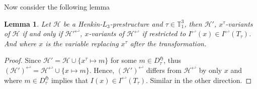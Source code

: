 \documentclass[11pt,a4paper]{article}
\newtheorem{lemma}[theorem]{Lemma}
\newcommand{\tofo}{\hookleftarrow}
\begin{document}
Now consider the following lemma

\begin{lemma}
\label{lemma:x-variant}
Let $\mathcal{H}$ be a Henkin-$L_3$-prestructure and $\tau \in \mathbb{T}_1^3$, then  $\mathcal{H}'$, $x^{\tau}$-variants of $\mathcal{H}$ if and only if  $\mathcal{H}'^{\tofo}$, $x$-variants of $\mathcal{H}^{\tofo}$ if restricted to $I^{\tofo}(x)\in  I^{\tofo}(T_{\tau})$. And where $x$ is the variable replacing $x^{\tau}$ after the transformation.
\end{lemma}
\begin{proof}
Since $\mathcal{H}'= \mathcal{H} \cup \{ x^{\tau} \mapsto m\}$ for some $m \in D_{\tau}^{\mathfrak{H}}$, thus $(\mathcal{H}')^{\tofo}= \mathcal{H}^{\tofo} \cup \{ x \mapsto m\}$. Hence, $(\mathcal{H}')^{\tofo}$ differs from $ \mathcal{H}^{\tofo}$ by only $x$ and where $m \in  D_{\tau}^{\mathfrak{H}}$ implies that $I(x) \in I^{\tofo}(T_{\tau})$. Similar in the other direction.
\end{proof}
\end{document}

